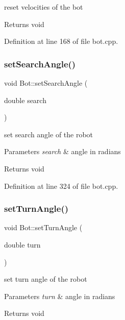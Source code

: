 reset velocities of the bot 

\begin{DoxyReturn}{Returns}
void 
\end{DoxyReturn}


Definition at line 168 of file bot.\+cpp.

\mbox{\label{class_bot_ab2b0ed8f324e0ed8777b0ed82bd5a718}} 
\subsubsection{\texorpdfstring{set\+Search\+Angle()}{setSearchAngle()}}
{\footnotesize\ttfamily void Bot\+::set\+Search\+Angle (\begin{DoxyParamCaption}\item[{double}]{search }\end{DoxyParamCaption})}



set search angle of the robot 


\begin{DoxyParams}{Parameters}
{\em search} & angle in radians \\
\hline
\end{DoxyParams}
\begin{DoxyReturn}{Returns}
void 
\end{DoxyReturn}


Definition at line 324 of file bot.\+cpp.

\mbox{\label{class_bot_a1df4f3955f1e3dfae7aba746c852945c}} 
\subsubsection{\texorpdfstring{set\+Turn\+Angle()}{setTurnAngle()}}
{\footnotesize\ttfamily void Bot\+::set\+Turn\+Angle (\begin{DoxyParamCaption}\item[{double}]{turn }\end{DoxyParamCaption})}



set turn angle of the robot 


\begin{DoxyParams}{Parameters}
{\em turn} & angle in radians \\
\hline
\end{DoxyParams}
\begin{DoxyReturn}{Returns}
void 
\end{DoxyReturn}


